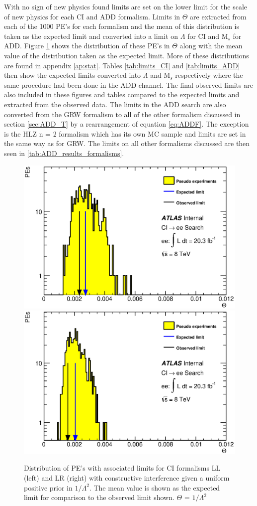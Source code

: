     With no sign of new physics found limits are set on the lower limit for the scale of new physics for each CI and ADD formalism. Limits in $\Theta$ are extracted from each of the 1000 PE's for each formalism and the mean of this distribution is taken as the expected limit and converted into a limit on $\Lambda$ for CI and M$_{s}$ for ADD. Figure \ref{fig:Theta_CI_main} shows the distribution of these PE's in $\Theta$ along with the mean value of the distribution taken as the expected limit. More of these distributions are found in appendix \ref{ap:stat}. Tables \ref{tab:limits_CI} and \ref{tab:limits_ADD} then show the expected limits converted into $\Lambda$ and M$_{s}$ respectively where the same procedure had been done in the ADD channel. The final observed limits are also included in these figures and tables compared to the expected limits and extracted from the observed data. The limits in the ADD search are also converted from the GRW formalism to all of the other formalism discussed in section \ref{sec:ADD_T} by a rearrangement of equation \ref{eq:ADDF}. The exception is the HLZ n = 2 formalism which has its own MC sample and limits are set in the same way as for GRW. The limits on all other formalisms discussed are then seen in \ref{tab:ADD_results_formalisms}.


    \begin{figure}[h]
        \begin{center}
            \includegraphics[width=0.49\linewidth]{images/ee__LL_minus_L2/Theta.eps}
            \includegraphics[width=0.49\linewidth]{images/ee__LR_minus_L2/Theta.eps}
        \end{center}
       \caption{Distribution of PE's with associated limits for CI formalisms LL (left) and LR (right) with constructive interference given a uniform positive prior in $1/\Lambda^{2}$. The mean value is shown as the expected limit for comparison to the observed limit shown. $\Theta$ = $1/\Lambda^{2}$}
       \label{fig:Theta_CI_main}
    \end{figure}

